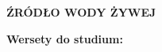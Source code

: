 \documentclass[10pt,a4paper,oneside]{article}
\begin{document}
\centerline{\textbf{\MakeUppercase{Źródło wody żywej}}}
\begin{center}
\textbf{Wersety do studium:} 
\end{center}
\end{document}
